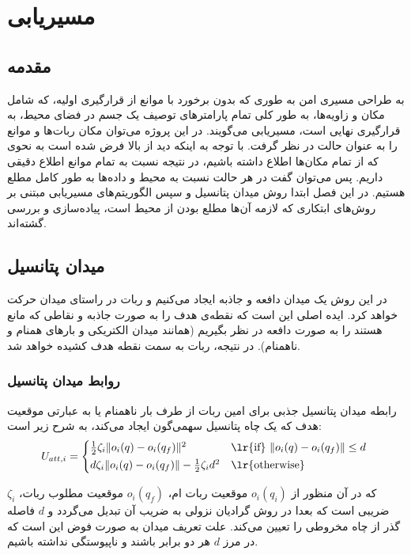 \chapter{مسیریابی}\label{ch path planning}

\section{مقدمه}

به طراحی مسیری امن به طوری که بدون برخورد با موانع از قرارگیری اولیه، که شامل مکان و زاویه‌ها، به طور کلی تمام پارامترهای توصیف یک جسم در فضای محیط، به قرارگیری نهایی است، مسیریابی می‌گویند. در این پروژه می‌توان مکان ربات‌ها و موانع را به عنوان حالت در نظر گرفت. با توجه به اینکه دید از بالا فرض شده است به نحوی که از تمام مکان‌ها اطلاع داشته باشیم، در نتیجه نسبت به تمام موانع اطلاع دقیقی داریم. پس می‌توان گفت در هر حالت نسبت به محیط و داده‌ها به طور کامل مطلع هستیم. در این فصل ابتدا روش میدان پتانسیل و سپس الگوریتم‌های مسیریابی مبتنی بر روش‌های ابتکاری که لازمه آن‌ها مطلع بودن از محیط است، پیاده‌سازی و بررسی گشته‌اند.

\section{میدان پتانسیل}
در این روش یک میدان دافعه و جاذبه ایجاد می‌کنیم و ربات در راستای میدان حرکت خواهد کرد. ایده اصلی این است که نقطه‌ی هدف را به صورت جاذبه و نقاطی که مانع هستند را به صورت دافعه در نظر بگیریم (همانند میدان الکتریکی و بارهای همنام و ناهمنام). در نتیجه، ربات به سمت نقطه هدف کشیده خواهد شد.

\subsection{روابط میدان پتانسیل}
رابطه میدان پتانسیل جذبی برای امین ربات از طرف بار ناهمنام یا به عبارتی موقعیت هدف که یک چاه پتانسیل سهمی‌گون ایجاد می‌کند، به شرح زیر است:
\begin{equation}\label{eq Uatt}
U_{att,i} = 
\begin{cases*}
\frac{1}{2}\zeta_i\|o_i(q) - o_i(q_f)\|^2 & \lr{if} $\|o_i(q) - o_i(q_f)\| \le d$ \\
d\zeta_i\|o_i(q) - o_i(q_f)\|-\frac{1}{2}\zeta_id^2 & \lr{otherwise}
\end{cases*}
\end{equation}

که در آن منظور از $o_i(q_i)$ موقعیت ربات ام، $o_i(q_f)$ موقعیت مطلوب ربات، $\zeta_i$ ضریبی است که بعدا در روش گرادیان نزولی به ضریب آن تبدیل می‌گردد و $d$ فاصله گذر از چاه مخروطی را تعیین می‌کند. علت تعریف میدان به صورت فوض این است که در مرز $d$ هر دو برابر باشند و ناپیوستگی نداشته باشیم.

